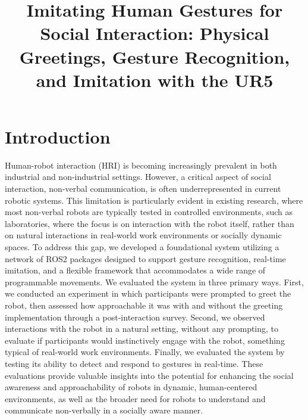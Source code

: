 \documentclass[conference]{IEEEtran}
\begin{document}
\title{Imitating Human Gestures for Social Interaction: Physical Greetings, Gesture Recognition, and Imitation with the UR5\\
}


\author{
\and
{}
}

\maketitle

\section{Introduction}
Human-robot interaction (HRI) is becoming increasingly prevalent in both industrial and non-industrial settings. However, a critical aspect of social interaction, non-verbal communication, is often underrepresented in current robotic systems. This limitation is particularly evident in existing research, where most non-verbal robots are typically tested in controlled environments, such as laboratories, where the focus is on interaction with the robot itself, rather than on natural interactions in real-world work environments or socially dynamic spaces. To address this gap, we developed a foundational system utilizing a network of ROS2 packages designed to support gesture recognition, real-time imitation, and a flexible framework that accommodates a wide range of programmable movements. We evaluated the system in three primary ways. First, we conducted an experiment in which participants were prompted to greet the robot, then assessed how approachable it was with and without the greeting implementation through a post-interaction survey. Second, we observed interactions with the robot in a natural setting, without any prompting, to evaluate if participants would instinctively engage with the robot, something typical of real-world work environments. Finally, we evaluated the system by testing its ability to detect and respond to gestures in real-time. These evaluations provide valuable insights into the potential for enhancing the social awareness and approachability of robots in dynamic, human-centered environments, as well as the broader need for robots to understand and communicate non-verbally in a socially aware manner.
\end{document}
